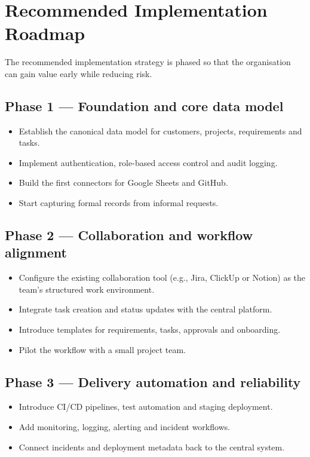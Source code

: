 \documentclass[12pt,a4paper]{report}
\begin{document}
\section{Recommended Implementation Roadmap}
The recommended implementation strategy is phased so that the organisation can gain value early while reducing risk.

\subsection*{Phase 1 --- Foundation and core data model}
\begin{itemize}[leftmargin=2em]
    \item Establish the canonical data model for customers, projects, requirements and tasks.
    \item Implement authentication, role-based access control and audit logging.
    \item Build the first connectors for Google Sheets and GitHub.
    \item Start capturing formal records from informal requests.
\end{itemize}

\subsection*{Phase 2 --- Collaboration and workflow alignment}
\begin{itemize}[leftmargin=2em]
    \item Configure the existing collaboration tool (e.g., Jira, ClickUp or Notion) as the team's structured work environment.
    \item Integrate task creation and status updates with the central platform.
    \item Introduce templates for requirements, tasks, approvals and onboarding.
    \item Pilot the workflow with a small project team.
\end{itemize}

\subsection*{Phase 3 --- Delivery automation and reliability}
\begin{itemize}[leftmargin=2em]
    \item Introduce CI/CD pipelines, test automation and staging deployment.
    \item Add monitoring, logging, alerting and incident workflows.
    \item Connect incidents and deployment metadata back to the central system.
\end{itemize}
\end{document}
